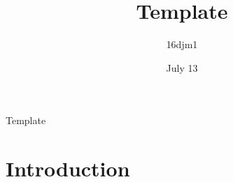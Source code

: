 \documentclass{article}
\begin{document}
\title{Template}
\author{16djm1}
\date{July 13}

\maketitle

\begin{center}
  Template
\end{center}

\section{Introduction}
\end{document}
